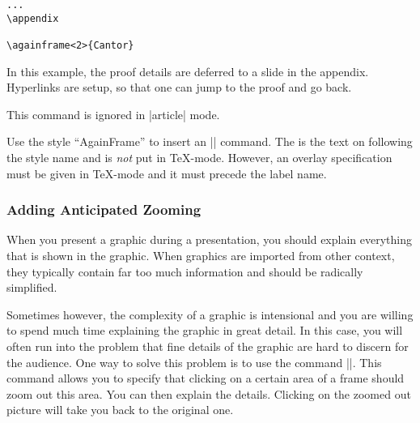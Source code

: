 \begin{command}{\againframe{}}
\begin{verbatim}
...
\appendix

\againframe<2>{Cantor}
\end{verbatim}
  In this example, the proof details are deferred to a slide in the
  appendix. Hyperlinks are setup, so that one can jump to the proof
  and go back.

  \articlenote
  This command is ignored in |article| mode.

  \lyxnote
  Use the style ``AgainFrame'' to insert an |\againframe| command. The
   is the text on following the style name
  and is \emph{not} put in \TeX-mode. However, an overlay specification
  must be given in \TeX-mode and it must precede the label name.
\end{command}



\subsubsection{Adding Anticipated Zooming}

When you present a graphic during a presentation, you should explain
everything that is shown in the graphic. When graphics are imported
from other context, they typically contain far too much information
and should be radically simplified.

Sometimes however, the complexity of a graphic is intensional and you
are willing to spend much time explaining the graphic in great
detail. In this case, you will often run into the problem that fine
details of the graphic are hard to discern for the audience. One way
to solve this problem is to use the command |\framezoom|. This command
allows you to specify that clicking on a certain area of a frame
should zoom out this area. You can then explain the details. Clicking
on the zoomed out picture will take you back to the original one.

